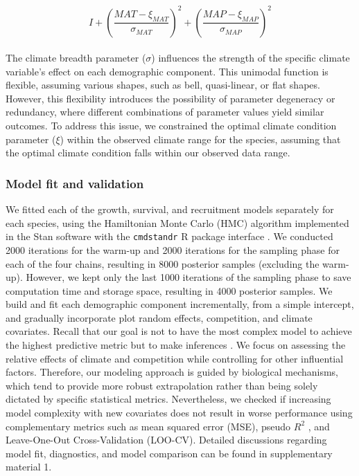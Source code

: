 \begin{equation}
  I + \left(\frac{MAT - \xi_{MAT}}{\sigma_{MAT}}\right)^2 + \left(\frac{MAP - \xi_{MAP}}{\sigma_{MAP}}\right)^2
\label{eq:compEffect}\end{equation}\\

The climate breadth parameter (\(\sigma\)) influences the strength of
the specific climate variable's effect on each demographic component.
This unimodal function is flexible, assuming various shapes, such as
bell, quasi-linear, or flat shapes. However, this flexibility introduces
the possibility of parameter degeneracy or redundancy, where different
combinations of parameter values yield similar outcomes. To address this
issue, we constrained the optimal climate condition parameter (\(\xi\))
within the observed climate range for the species, assuming that the
optimal climate condition falls within our observed data range.\\

\hypertarget{model-fit-and-validation}{%
\subsubsection{Model fit and
validation}\label{model-fit-and-validation}}

We fitted each of the growth, survival, and recruitment models
separately for each species, using the Hamiltonian Monte Carlo (HMC)
algorithm implemented in the Stan software \citep[version
2.30.1][]{stan2022stan} with the \texttt{cmdstandr} R package interface
\citep[version 0.5.3][]{cmdstanr}. We conducted 2000 iterations for the
warm-up and 2000 iterations for the sampling phase for each of the four
chains, resulting in 8000 posterior samples (excluding the warm-up).
However, we kept only the last 1000 iterations of the sampling phase to
save computation time and storage space, resulting in 4000 posterior
samples. We build and fit each demographic component incrementally, from
a simple intercept, and gradually incorporate plot random effects,
competition, and climate covariates. Recall that our goal is not to have
the most complex model to achieve the highest predictive metric but to
make inferences \citep{Tredennick2021}. We focus on assessing the
relative effects of climate and competition while controlling for other
influential factors. Therefore, our modeling approach is guided by
biological mechanisms, which tend to provide more robust extrapolation
\citep{Briscoe2019} rather than being solely dictated by specific
statistical metrics. Nevertheless, we checked if increasing model
complexity with new covariates does not result in worse performance
using complementary metrics such as mean squared error (MSE), pseudo
\(R^2\) \citep{Gelman2019}, and Leave-One-Out Cross-Validation (LOO-CV).
Detailed discussions regarding model fit, diagnostics, and model
comparison can be found in supplementary material 1.\\

